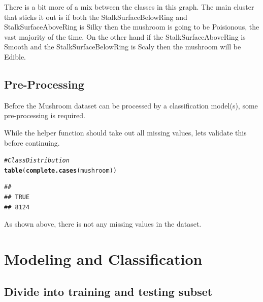 \documentclass[10pt  ,usenames, dvipsnames]{article}\usepackage[]{graphicx}\usepackage[]{color}
\makeatletter
\newcommand{\hlcom}[1]{\textcolor[rgb]{0.678,0.584,0.686}{\textit{#1}}}%
\newcommand{\hlstd}[1]{\textcolor[rgb]{0.345,0.345,0.345}{#1}}%
\newcommand{\hlkwd}[1]{\textcolor[rgb]{0.737,0.353,0.396}{\textbf{#1}}}%
\newenvironment{kframe}{%
 \def\at@end@of@kframe{}%
 \ifinner\ifhmode%
  \def\at@end@of@kframe{\end{minipage}}%
  \begin{minipage}{\columnwidth}%
 \fi\fi%
 \def\FrameCommand##1{\hskip\@totalleftmargin \hskip-\fboxsep
 \colorbox{shadecolor}{##1}\hskip-\fboxsep
     \hskip-\linewidth \hskip-\@totalleftmargin \hskip\columnwidth}%
 \MakeFramed {\advance\hsize-\width
   \@totalleftmargin\z@ \linewidth\hsize
   \@setminipage}}%
 {\par\unskip\endMakeFramed%
 \at@end@of@kframe}
\newenvironment{knitrout}{}{} %
\makeatother
\begin{document}
There is a bit more of a mix between the classes in this graph. The main cluster that sticks it out is if both the StalkSurfaceBelowRing and StalkSurfaceAboveRing is Silky then the mushroom is going to be Poisionous, the vast majority of the time. On the other hand if the 
StalkSurfaceAboveRing is Smooth and the StalkSurfaceBelowRing is Scaly then the mushroom will be Edible.

\clearpage

\subsection {Pre-Processing}

Before the Mushroom dataset can be processed by a classification model(s), some pre-processing is required.

While the helper function should take out all missing values, lets validate this before continuing.

\begin{knitrout}
\color{fgcolor}\begin{kframe}
\begin{alltt}
\hlcom{#Class Distribution}
\hlkwd{table}\hlstd{(}\hlkwd{complete.cases} \hlstd{(mushroom))}
\end{alltt}
\end{kframe}
\end{knitrout}


\begin{knitrout}
\color{fgcolor}\begin{kframe}
\begin{verbatim}
## 
## TRUE 
## 8124
\end{verbatim}
\end{kframe}
\end{knitrout}

As shown above, there is not any missing values in the dataset.


\clearpage



\section {Modeling and Classification}



\subsection {Divide into training and testing subset}
\end{document}
